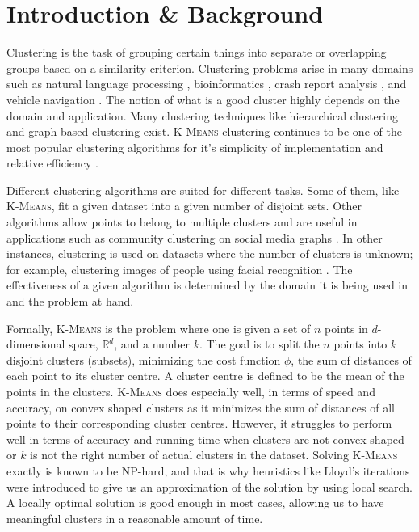 \documentclass[12pt]{dalthesis}
\newcommand*{\kmeansn}{\textsc{K-Means}} %
\newcommand*{\kmeans}{\textsc{K-Means} } %
\begin{document}
\mainmatter

\chapter{Introduction \& Background}
Clustering is the task of grouping certain things into separate or overlapping groups based on a similarity criterion. Clustering problems arise in many domains such as
natural language processing \citep{ravichandran2005randomized},
bioinformatics \citep{edgar2010search}, 
crash report analysis \citep{soto2016machine},
and vehicle navigation \citep{maio1996dynamic}. 
The notion of what is a good cluster highly depends on the domain and application. Many clustering techniques like hierarchical clustering \citep{corpet1988multiple}
and graph-based clustering \citep{schaeffer2007graph}
exist. \kmeans clustering continues to be one of the most popular clustering algorithms for it's simplicity of implementation and relative efficiency \citep{jain2010data}.

Different clustering algorithms are suited for different tasks. Some of them, like \kmeansn, fit a given dataset into a given number of disjoint sets. Other algorithms allow points to belong to multiple clusters and are useful in applications such as community clustering on social media graphs \citep{epasto2017ego}. In other instances, clustering is used on datasets where the number of clusters is unknown; for example, clustering images of people using facial recognition \citep{schroff2015facenet}. The effectiveness of a given algorithm is determined by the domain it is being used in and the problem at hand.

Formally, \kmeans is the problem where one is given a set of $n$ points in $d$-dimensional space, $\mathbb{R}^d$, and a number $k$. The goal is to split the $n$ points into $k$ disjoint clusters (subsets), minimizing the cost function $\phi$, the sum of distances of each point to its cluster centre. A cluster centre is defined to be the mean of the points in the clusters. \kmeans does especially well, in terms of speed and accuracy, on convex shaped clusters as it minimizes the sum of distances of all points to their corresponding cluster centres. However, it struggles to perform well in terms of accuracy and running time when clusters are not convex shaped or $k$ is not the right number of actual clusters in the dataset. Solving \kmeans exactly is known to be NP-hard, and that is why heuristics like Lloyd's \citep{1056489} iterations were introduced to give us an approximation of the solution by using local search. A locally optimal solution is good enough in most cases, allowing us to have meaningful clusters in a reasonable amount of time.
\end{document}
